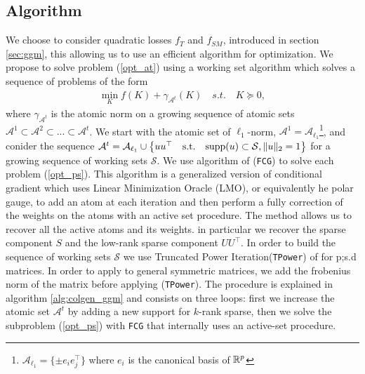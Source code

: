 \subsection{Algorithm}
We choose to consider quadratic losses $f_{T}$ and $f_{SM}$, introduced in section \ref{sec:ggm}, this allowing us to use an efficient algorithm for optimization. We propose to solve problem (\ref{opt_at}) using a working set algorithm which solves a sequence
of problems of the form 
\begin{align}
\label{opt_ps}
\min_{K} f(K)+ \gamma_{\mathcal{A}^{t}}(K) \quad s.t. \quad K \succeq 0,
\end{align}
where $\gamma_{\mathcal{A}^{t}}$ is the atomic norm on a growing sequence of atomic sets $\mathcal{A}^{1}\subset \mathcal{A}^{2} \subset ... \subset \mathcal{A}^{t}$. We start with the atomic set of $\ell_1$-norm, $\mathcal{A}^{1}=\mathcal{A}_{\ell_{1}}$\footnote{$\mathcal{A}_{\ell_{1}}=\{\pm e_i e_j^{\top}\}$ where $e_i$ is the canonical basis of $\mathbb{R}^p$}, and conider the sequence $\mathcal{A}^{t}=\mathcal{A}_{\ell_{1}}\cup \big\{uu^{\top} \quad \text{s.t.} \quad \text{supp}(u)\subset \mathcal{S}, \|u\|_{2}=1 \big\}$ for a growing sequence of working sets $\mathcal{S}$. We use algorithm of \citet{vinyes2017} (\texttt{FCG}) to solve each problem (\ref{opt_ps}). This algorithm is a generalized version of conditional gradient which uses Linear Minimization Oracle (LMO), or equivalently  he polar gauge, to add an  atom at each iteration and then perform a fully correction of the weights on the atoms with an active set procedure. The method allows us to recover all the active atoms and its weights. in particular we recover the sparse component $S$ and the low-rank sparse component $UU^{\top}$.  In order to build the  sequence of working sets $\mathcal{S}$ we use Truncated Power Iteration(\texttt{TPower}) of \citet{yuan2013truncated} for p;s.d matrices. In order to apply to general symmetric matrices, we add the frobenius norm of the matrix before applying (\texttt{TPower}). The procedure is explained in algorithm \ref{alg:colgen_ggm} and consists on three loops: first we increase the atomic set $\mathcal{A}^{t}$ by adding a new support for $k$-rank sparse, then we solve the subproblem (\ref{opt_ps}) with \texttt{FCG} that internally uses an active-set procedure.


